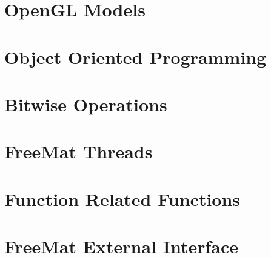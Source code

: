 \documentclass{book}
\begin{document}
\chapter{OpenGL Models}





\chapter{Object Oriented Programming}
































\chapter{Bitwise Operations}




\chapter{FreeMat Threads}








\chapter{Function Related Functions}


\chapter{FreeMat External Interface}












\end{document}
